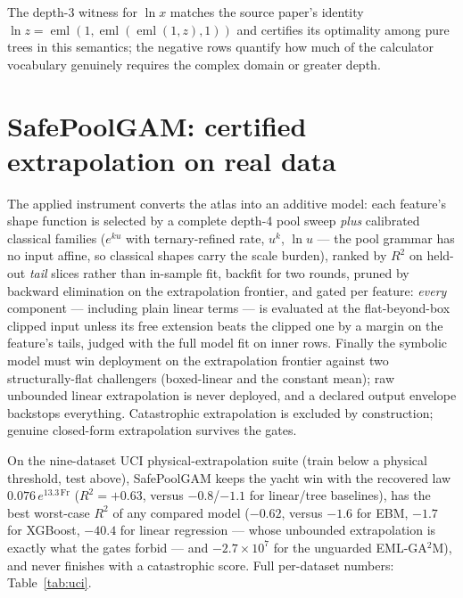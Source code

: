 \documentclass[11pt]{article}
\newcommand{\eml}{\operatorname{eml}}
\begin{document}
The depth-3 witness for $\ln x$ matches the source paper's identity
$\ln z = \eml(1,\eml(\eml(1,z),1))$ and certifies its optimality among
pure trees in this semantics; the negative rows quantify how much of
the calculator vocabulary genuinely requires the complex domain or
greater depth.

\section{SafePoolGAM: certified extrapolation on real data}
\label{sec:safe}

The applied instrument converts the atlas into an additive model:
each feature's shape function is selected by a complete depth-4 pool
sweep \emph{plus} calibrated classical families ($e^{ku}$ with
ternary-refined rate, $u^k$, $\ln u$ — the pool grammar has no input
affine, so classical shapes carry the scale burden), ranked by
$R^2$ on held-out \emph{tail} slices rather than in-sample fit,
backfit for two rounds, pruned by backward elimination on the
extrapolation frontier, and gated per feature: \emph{every} component
— including plain linear terms — is evaluated at the flat-beyond-box
clipped input unless its free extension beats the clipped one by a
margin on the feature's tails, judged with the full model fit on
inner rows. Finally the symbolic model must win deployment on the
extrapolation frontier against two structurally-flat challengers
(boxed-linear and the constant mean); raw unbounded linear
extrapolation is never deployed, and a declared output envelope
backstops everything. Catastrophic extrapolation is excluded by
construction; genuine closed-form extrapolation survives the gates.

On the nine-dataset UCI physical-extrapolation suite (train below a
physical threshold, test above), SafePoolGAM keeps the yacht win with
the recovered law $0.076\,e^{13.3\,\mathrm{Fr}}$ ($R^2=+0.63$, versus
$-0.8$/$-1.1$ for linear/tree baselines), has the best worst-case
$R^2$ of any compared model ($-0.62$, versus $-1.6$ for EBM, $-1.7$
for XGBoost, $-40.4$ for linear regression — whose unbounded
extrapolation is exactly what the gates forbid — and
$-2.7\times10^{7}$ for the unguarded EML-GA$^2$M), and never finishes
with a catastrophic score. Full per-dataset numbers:
Table~\ref{tab:uci}.
\end{document}
